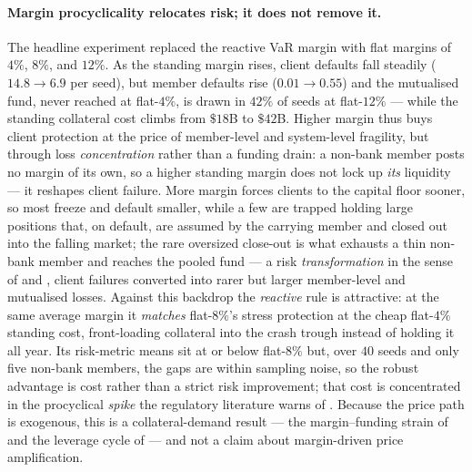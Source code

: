 \paragraph{Margin procyclicality relocates risk; it does not remove it.}
The headline experiment replaced the reactive VaR margin with flat margins of $4\%$, $8\%$, and $12\%$. As
the standing margin rises, client defaults fall steadily ($14.8 \to 6.9$ per seed), but member defaults rise
($0.01 \to 0.55$) and the mutualised fund, never reached at flat-$4\%$, is drawn in $42\%$ of seeds at
flat-$12\%$ --- while the standing collateral cost climbs from $\$18$B to $\$42$B. Higher margin thus buys
client protection at the price of member-level and system-level fragility, but through loss
\emph{concentration} rather than a funding drain: a non-bank member posts no margin of its own, so a higher
standing margin does not lock up \emph{its} liquidity --- it reshapes client failure. More margin forces
clients to the capital floor sooner, so most freeze and default smaller, while a few are trapped holding
large positions that, on default, are assumed by the carrying member and closed out into the falling market;
the rare oversized close-out is what exhausts a thin non-bank member and reaches the pooled fund --- a risk
\emph{transformation} in the sense of \citet{cont_2017} and \citet{biais_heider_hoerova_2016}, client
failures converted into rarer but larger member-level and mutualised losses. Against this backdrop the
\emph{reactive} rule is attractive: at the same average margin it \emph{matches} flat-$8\%$'s stress
protection at the cheap flat-$4\%$ standing cost, front-loading collateral into the crash trough instead of
holding it all year. Its risk-metric means sit at or below flat-$8\%$ but, over $40$ seeds and only five
non-bank members, the gaps are within sampling noise, so the robust advantage is cost rather than a strict
risk improvement; that cost is concentrated in the procyclical \emph{spike} the regulatory literature warns
of \citep{glasserman_wu_2018, esrb_2020, blanck_2025}. Because the price path is exogenous, this is a
collateral-demand result --- the margin--funding strain of \citet{brunnermeier_pedersen_2009} and the
leverage cycle of \citet{aymanns_farmer_2015, thurner_2012} --- and not a claim about margin-driven price
amplification.

